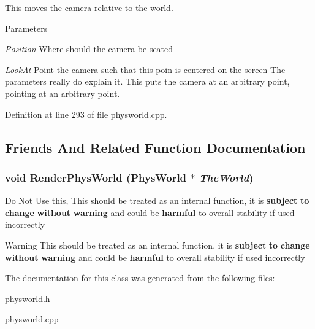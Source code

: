 This moves the camera relative to the world. 
\begin{DoxyParams}{Parameters}
\item[{\em Position}]Where should the camera be seated \item[{\em LookAt}]Point the camera such that this poin is centered on the screen The parameters really do explain it. This puts the camera at an arbitrary point, pointing at an arbitrary point. \end{DoxyParams}


Definition at line 293 of file physworld.cpp.

\subsection{Friends And Related Function Documentation}
\hypertarget{classPhysWorld_a54ca2a75bbccb9b2129f434874f1e693}{
\subsubsection[{RenderPhysWorld}]{\setlength{\rightskip}{0pt plus 5cm}void RenderPhysWorld ({\bf PhysWorld} $\ast$ {\em TheWorld})}}
\label{db/df5/classPhysWorld_a54ca2a75bbccb9b2129f434874f1e693}
Do Not Use this, This should be treated as an internal function, it is {\bfseries subject} {\bfseries to} {\bfseries change} {\bfseries without} {\bfseries warning} and could be {\bfseries harmful} to overall stability if used incorrectly \begin{DoxyWarning}{Warning}
This should be treated as an internal function, it is {\bfseries subject} {\bfseries to} {\bfseries change} {\bfseries without} {\bfseries warning} and could be {\bfseries harmful} to overall stability if used incorrectly 
\end{DoxyWarning}


The documentation for this class was generated from the following files:\begin{DoxyCompactItemize}
\item 
physworld.h\item 
physworld.cpp\end{DoxyCompactItemize}
